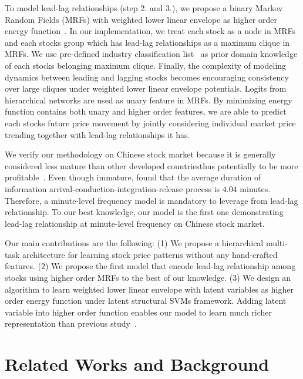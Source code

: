 \documentclass[sigconf, anonymous, review]{acmart}
\renewcommand{\citename}{\citet}
\renewcommand{\cite}{\citep}
\begin{document}
To model lead-lag relationships (step 2. and 3.), we propose a
binary Markov Random Fields (MRFs) with weighted lower linear
envelope as higher order energy
function~\cite{Kohli:CVPR07,Nowozin:2011,Gould:ICML2011,gouldlearning}.
In our implementation, we treat each stock as a node in MRFs and
each stocks group which has lead-lag relationships as a maximum
clique in MRFs. We use pre-defined industry classification
list~\cite{ths} as prior domain knowledge of each stock\textquotesingle s
belonging maximum clique. Finally, the complexity of modeling
dynamics between leading and lagging stocks becomes encouraging
consistency over large cliques under weighted lower linear
envelope potentials. Logits from hierarchical networks are used
as unary feature in MRFs. By minimizing energy function contains
both unary and higher order features, we are able to predict each
stock\textquotesingle s future price movement by jointly considering individual
market price trending together with lead-lag relationships it
has.

We verify our methodology on Chinese stock market because
it is generally considered less mature than other developed
countries\textquotesingle thus potentially to be more
profitable~\cite{bessembinder1995profitability}. Even though
immature, \citename{fangyan2012} found that the average duration
of information arrival-conduction-integration-release process is
$4.04$ minutes. Therefore, a minute-level frequency model is
mandatory to leverage from lead-lag relationship. To our best
knowledge, our model is the first one demonstrating lead-lag
relationship at minute-level frequency on Chinese stock market.

Our main contributions are the following: (1) We propose a
hierarchical multi-task architecture for learning stock price
patterns without any hand-crafted features. (2) We propose the
first model that encode lead-lag relationship among stocks using
higher order MRFs to the best of our knowledge. (3) We design an
algorithm to learn weighted lower linear envelope with latent
variables as higher order energy function under latent structural
SVMs framework. Adding latent variable into higher order function
enables our model to learn much richer representation than
previous study~\cite{gouldlearning}.

\section{Related Works and Background}
\label{sec:background}
\end{document}
